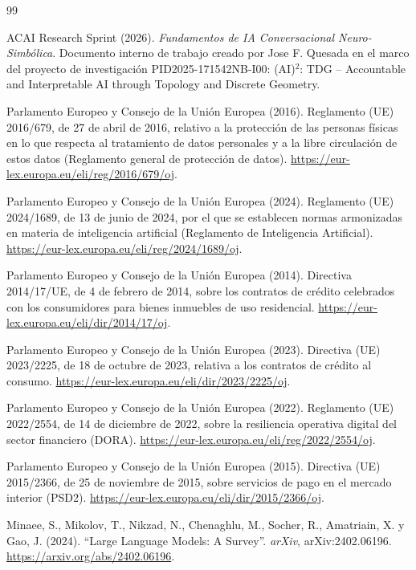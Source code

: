 \begin{thebibliography}{99}

ACAI Research Sprint (2026).
\textit{Fundamentos de IA Conversacional Neuro-Simbólica}.
Documento interno de trabajo creado por Jose F. Quesada en el marco del proyecto de investigación PID2025-171542NB-I00: (AI)$^{2}$: TDG -- Accountable and Interpretable AI through Topology and Discrete Geometry.

Parlamento Europeo y Consejo de la Unión Europea (2016).
Reglamento (UE) 2016/679, de 27 de abril de 2016, relativo a la protección de las personas físicas en lo que respecta al tratamiento de datos personales y a la libre circulación de estos datos (Reglamento general de protección de datos).
\url{https://eur-lex.europa.eu/eli/reg/2016/679/oj}.

Parlamento Europeo y Consejo de la Unión Europea (2024).
Reglamento (UE) 2024/1689, de 13 de junio de 2024, por el que se establecen normas armonizadas en materia de inteligencia artificial (Reglamento de Inteligencia Artificial).
\url{https://eur-lex.europa.eu/eli/reg/2024/1689/oj}.

Parlamento Europeo y Consejo de la Unión Europea (2014).
Directiva 2014/17/UE, de 4 de febrero de 2014, sobre los contratos de crédito celebrados con los consumidores para bienes inmuebles de uso residencial.
\url{https://eur-lex.europa.eu/eli/dir/2014/17/oj}.

Parlamento Europeo y Consejo de la Unión Europea (2023).
Directiva (UE) 2023/2225, de 18 de octubre de 2023, relativa a los contratos de crédito al consumo.
\url{https://eur-lex.europa.eu/eli/dir/2023/2225/oj}.

Parlamento Europeo y Consejo de la Unión Europea (2022).
Reglamento (UE) 2022/2554, de 14 de diciembre de 2022, sobre la resiliencia operativa digital del sector financiero (DORA).
\url{https://eur-lex.europa.eu/eli/reg/2022/2554/oj}.

Parlamento Europeo y Consejo de la Unión Europea (2015).
Directiva (UE) 2015/2366, de 25 de noviembre de 2015, sobre servicios de pago en el mercado interior (PSD2).
\url{https://eur-lex.europa.eu/eli/dir/2015/2366/oj}.

Minaee, S., Mikolov, T., Nikzad, N., Chenaghlu, M., Socher, R., Amatriain, X. y Gao, J. (2024).
``Large Language Models: A Survey''.
\textit{arXiv}, arXiv:2402.06196.
\url{https://arxiv.org/abs/2402.06196}.


\end{thebibliography}
